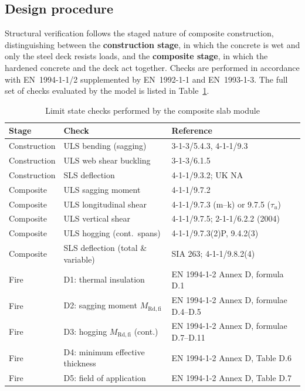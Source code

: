 \subsection{Design procedure}
\label{sec:design_procedure}
Structural verification follows the staged nature of composite construction, distinguishing between the \textbf{construction stage}, in which the concrete is wet and only the steel deck resists loads, and the \textbf{composite stage}, in which the hardened concrete and the deck act together. Checks are performed in accordance with EN~1994-1-1/2 supplemented by EN~1992-1-1 and EN~1993-1-3. The full set of checks evaluated by the model is listed in Table~\ref{tab:checks_summary}.

\begin{table}[h!]
\small
\centering
\caption{Limit state checks performed by the composite slab module}
\label{tab:checks_summary}
\begin{tabular}{p{2.5cm} p{4.0cm} p{6.5cm}}
\toprule
\textbf{Stage} & \textbf{Check} & \textbf{Reference} \\
\midrule
Construction & ULS bending (sagging) & 3-1-3/5.4.3, 4-1-1/9.3 \\
Construction & ULS web shear buckling      & 3-1-3/6.1.5 \\
Construction & SLS deflection              & 4-1-1/9.3.2; UK NA \\
Composite    & ULS sagging moment          & 4-1-1/9.7.2 \\
Composite    & ULS longitudinal shear      & 4-1-1/9.7.3 (m--k) or 9.7.5 ($\tau_u$) \\
Composite    & ULS vertical shear          & 4-1-1/9.7.5; 2-1-1/6.2.2 (2004)\\
Composite    & ULS hogging (cont.\ spans)  & 4-1-1/9.7.3(2)P, 9.4.2(3) \\
Composite    & SLS deflection (total \& variable) & SIA 263; 4-1-1/9.8.2(4) \\
Fire         & D1: thermal insulation      & EN 1994-1-2 Annex D, formula D.1 \\
Fire         & D2: sagging moment $M_\mathrm{Rd,fi}$ & EN 1994-1-2 Annex D, formulae D.4--D.5 \\
Fire         & D3: hogging $M_\mathrm{Rd,fi}$ (cont.) & EN 1994-1-2 Annex D, formulae D.7--D.11 \\
Fire         & D4: minimum effective thickness & EN 1994-1-2 Annex D, Table D.6 \\
Fire         & D5: field of application    & EN 1994-1-2 Annex D, Table D.7 \\
\bottomrule
\end{tabular}
\end{table}

